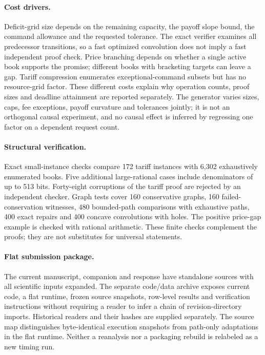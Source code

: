 \documentclass[11pt,letterpaper]{article}
\theoremstyle{definition}\newtheorem{remark}[theorem]{Remark}
\begin{document}
\paragraph{Cost drivers.} Deficit-grid size depends on the remaining capacity, the payoff slope bound, the command allowance and the requested tolerance. The exact verifier examines all predecessor transitions, so a fast optimized convolution does not imply a fast independent proof check. Price branching depends on whether a single active book supports the promise; different books with bracketing targets can leave a gap. Tariff compression enumerates exceptional-command subsets but has no resource-grid factor. These different costs explain why operation counts, proof sizes and deadline attainment are reported separately. The generator varies sizes, caps, fee exceptions, payoff curvature and tolerances jointly; it is not an orthogonal causal experiment, and no causal effect is inferred by regressing one factor on a dependent request count.

\paragraph{Structural verification.} Exact small-instance checks compare 172 tariff instances with 6,302 exhaustively enumerated books. Five additional large-rational cases include denominators of up to 513 bits. Forty-eight corruptions of the tariff proof are rejected by an independent checker. Graph tests cover 160 conservative graphs, 160 failed-conservation witnesses, 480 bounded-path comparisons with exhaustive paths, 400 exact repairs and 400 concave convolutions with holes. The positive price-gap example is checked with rational arithmetic. These finite checks complement the proofs; they are not substitutes for universal statements.

\paragraph{Flat submission package.} The current manuscript, companion and response have standalone sources with all scientific inputs expanded. The separate code/data archive exposes current code, a flat runtime, frozen source snapshots, row-level results and verification instructions without requiring a reader to infer a chain of revision-directory imports. Historical readers and their hashes are supplied separately. The source map distinguishes byte-identical execution snapshots from path-only adaptations in the flat runtime. Neither a reanalysis nor a packaging rebuild is relabeled as a new timing run.
\end{document}
